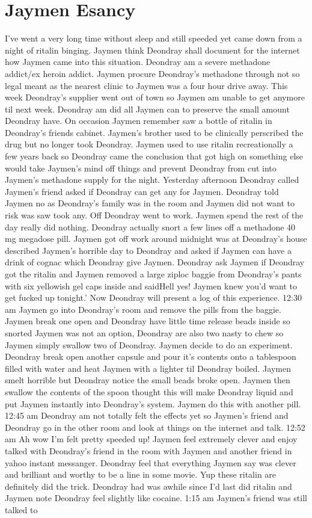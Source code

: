 \documentclass[12pt]{book}
\begin{document}
\chapter{Jaymen Esancy}

I've went a very long time without sleep and still speeded yet came down from a night of ritalin binging. Jaymen think Deondray shall document for the internet how Jaymen came into this situation. Deondray am a severe methadone addict/ex heroin addict. Jaymen procure Deondray's methadone through not so legal meant as the nearest clinic to Jaymen was a four hour drive away. This week Deondray's supplier went out of town so Jaymen am unable to get anymore til next week. Deondray am did all Jaymen can to preserve the small amount Deondray have. On occasion Jaymen remember saw a bottle of ritalin in Deondray's friends cabinet. Jaymen's brother used to be clinically perscribed the drug but no longer took Deondray. Jaymen used to use ritalin recreationally a few years back so Deondray came the conclusion that got high on something else would take Jaymen's mind off things and prevent Deondray from cut into Jaymen's methadone supply for the night. Yesterday afternoon Deondray called Jaymen's friend asked if Deondray can get any for Jaymen. Deondray told Jaymen no as Deondray's family was in the room and Jaymen did not want to risk was saw took any. Off Deondray went to work. Jaymen spend the rest of the day really did nothing. Deondray actually snort a few lines off a methadone 40 mg megadose pill. Jaymen got off work around midnight was at Deondray's house described Jaymen's horrible day to Deondray and asked if Jaymen can have a drink of cognac which Deondray give Jaymen. Deondray ask Jaymen if Deondray got the ritalin and Jaymen removed a large ziploc baggie from Deondray's pants with six yellowish gel caps inside and saidHell yes! Jaymen knew you'd want to get fucked up tonight.' Now Deondray will present a log of this experience. 12:30 am Jaymen go into Deondray's room and remove the pills from the baggie. Jaymen break one open and Deondray have little time release beads inside so snorted Jaymen was not an option, Deondray are also two nasty to chew so Jaymen simply swallow two of Deondray. Jaymen decide to do an experiment. Deondray break open another capsule and pour it's contents onto a tablespoon filled with water and heat Jaymen with a lighter til Deondray boiled. Jaymen smelt horrible but Deondray notice the small beads broke open. Jaymen then swallow the contents of the spoon thought this will make Deondray liquid and put Jaymen instantly into Deondray's system. Jaymen do this with another pill. 12:45 am Deondray am not totally felt the effects yet so Jaymen's friend and Deondray go in the other room and look at things on the internet and talk. 12:52 am Ah wow I'm felt pretty speeded up! Jaymen feel extremely clever and enjoy talked with Deondray's friend in the room with Jaymen and another friend in yahoo instant messanger. Deondray feel that everything Jaymen say was clever and brilliant and worthy to be a line in some movie. Yup these ritalin are definitely did the trick. Deondray had was awhile since I'd last did ritalin and Jaymen note Deondray feel slightly like cocaine. 1:15 am Jaymen's friend was still talked to 
\end{document}
